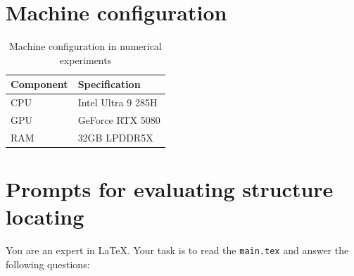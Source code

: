 \appendix

\section{Machine configuration}
\label{app:ms}

\begin{table}[htbp]
    \centering
    \caption{Machine configuration in numerical experiments}
    \label{tab:machine}
    \begin{tabular}{ll}
        \toprule
        \textbf{Component} & \textbf{Specification} \\
        \midrule
        CPU                & Intel Ultra 9 285H     \\
        GPU                & GeForce RTX 5080       \\
        RAM                & 32GB LPDDR5X           \\
        \bottomrule
    \end{tabular}
\end{table}

\section{Prompts for evaluating structure locating}
\label{app:20ques}

You are an expert in \LaTeX{}. Your task is to read the \texttt{main.tex} and answer the following questions:

